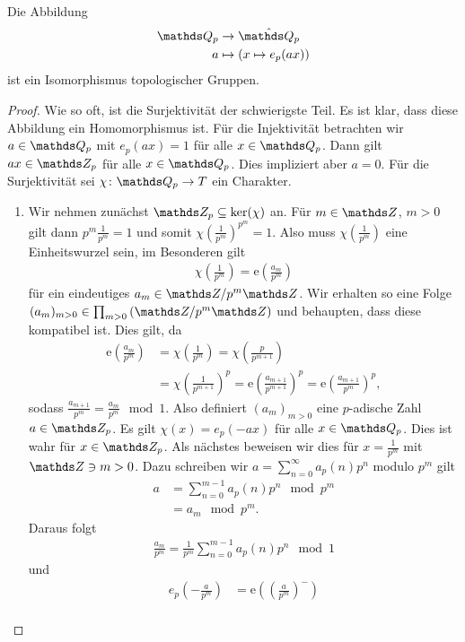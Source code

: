 \begin{prop}
Die Abbildung
\begin{align*}
\Q_p &\to \hat{\Q_p}\\
a &\mapsto (x \mapsto e_p(ax))
\end{align*}
ist ein Isomorphismus topologischer Gruppen.
\end{prop}
\begin{proof}
Wie so oft, ist die Surjektivität der schwierigste Teil.
Es ist klar, dass diese Abbildung ein Homomorphismus ist.
Für die Injektivität betrachten wir $a \in \Q_p$ mit $e_p(ax)=1$ für alle $x\in \Q_p$.
Dann gilt $ax \in \Z_p$ für alle $x\in \Q_p$. Dies impliziert aber $a=0$.
Für die Surjektivität sei $\chi\colon \Q_p \to T$ ein Charakter.
\begin{enumerate}[label=\roman*)]
\item Wir nehmen zunächst $\Z_p\subseteq \ker(\chi)$ an.
Für $m\in \Z$, $m>0$ gilt dann
$p^m \frac{1}{p^m}=1$ und somit $\chi(\frac{1}{p^m})^{p^m}=1$.
Also muss $\chi(\frac{1}{p^m})$ eine Einheitswurzel sein, im Besonderen gilt
\begin{align*}
\chi(\frac{1}{p^m})=\mathrm{e}(\frac{a_m}{p^m})
\end{align*}
für ein eindeutiges $a_m \in \Z/p^m\Z$.
Wir erhalten so eine Folge $(a_m)_{m> 0} \in \prod_{m>0} \left(\Z/p^m\Z\right)$ und behaupten, dass diese kompatibel ist.
Dies gilt, da
\begin{align*}
\mathrm{e}(\frac{a_m}{p^m})&=\chi(\frac{1}{p^m})=\chi(\frac{p}{p^{m+1}})\\
&=\chi(\frac{1}{p^{m+1}})^p=\mathrm{e}(\frac{a_{m+1}}{p^{m+1}})^p=\mathrm{e}(\frac{a_{m+1}}{p^{m}})^p,
\end{align*}
sodass $\frac{a_{m+1}}{p^m}=\frac{a_m}{p^m}\mod 1$.
Also definiert $(a_m)_{m>0}$ eine $p$-adische Zahl $a\in \Z_p$.
Es gilt $\chi(x)=e_p(-ax)$ für alle $x\in \Q_p$. Dies ist wahr für $x\in \Z_p$.
Als nächstes beweisen wir dies für $x=\frac{1}{p^m}$ mit $\Z \ni m>0$.
Dazu schreiben wir $a=\sum_{n=0}^\infty a_p(n)p^n$ modulo $p^m$ gilt
\begin{align*}
a&=\sum_{n=0}^{m-1}a_p(n)p^n \mod p^m\\
&=a_m \mod p^m.
\end{align*}
Daraus folgt
\begin{align*}
\frac{a_m}{p^m}=\frac{1}{p^m} \sum_{n=0}^{m-1} a_p(n)p^n \mod 1
\end{align*}
und
\begin{align*}
e_p(-\frac{a}{p^m})&=\mathrm{e}((\frac{a}{p^m})^-)\\

\end{align*}
\end{enumerate}
\end{proof}
